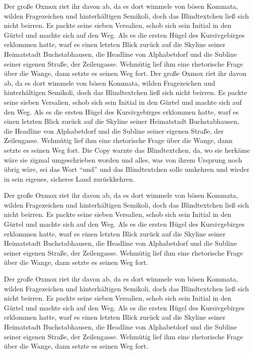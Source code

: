 \documentclass[%
	12pt,%
	a4paper,%
	oneside,%
	listof=totoc,
 	index=totoc,
	bibliography = totoc,
	parskip = half,%
	chapterprefix=false,%
	appendixprefix, %
	headings=small,%
]{scrreprt}
\begin{document}
Der große Oxmox riet ihr davon ab, da es dort wimmele von bösen Kommata, wilden Fragezeichen und hinterhältigen Semikoli, doch das Blindtextchen ließ sich nicht beirren. Es packte seine sieben Versalien, schob sich sein Initial in den Gürtel und machte sich auf den Weg. Als es die ersten Hügel des Kursivgebirges erklommen hatte, warf es einen letzten Blick zurück auf die Skyline seiner Heimatstadt Buchstabhausen, die Headline von Alphabetdorf und die Subline seiner eigenen Straße, der Zeilengasse. Wehmütig lief ihm eine rhetorische Frage über die Wange, dann setzte es seinen Weg fort. Der große Oxmox riet ihr davon ab, da es dort wimmele von bösen Kommata, wilden Fragezeichen und hinterhältigen Semikoli, doch das Blindtextchen ließ sich nicht beirren. Es packte seine sieben Versalien, schob sich sein Initial in den Gürtel und machte sich auf den Weg. Als es die ersten Hügel des Kursivgebirges erklommen hatte, warf es einen letzten Blick zurück auf die Skyline seiner Heimatstadt Buchstabhausen, die Headline von Alphabetdorf und die Subline seiner eigenen Straße, der Zeilengasse. Wehmütig lief ihm eine rhetorische Frage über die Wange, dann setzte es seinen Weg fort. Die Copy warnte das Blindtextchen, da, wo sie herkäme wäre sie zigmal umgeschrieben worden und alles, was von ihrem Ursprung noch übrig wäre, sei das Wort "`und"'  und das Blindtextchen solle umkehren und wieder in sein eigenes, sicheres Land zurückkehren.

Der große Oxmox riet ihr davon ab, da es dort wimmele von bösen Kommata, wilden Fragezeichen und hinterhältigen Semikoli, doch das Blindtextchen ließ sich nicht beirren. Es packte seine sieben Versalien, schob sich sein Initial in den Gürtel und machte sich auf den Weg. Als es die ersten Hügel des Kursivgebirges erklommen hatte, warf es einen letzten Blick zurück auf die Skyline seiner Heimatstadt Buchstabhausen, die Headline von Alphabetdorf und die Subline seiner eigenen Straße, der Zeilengasse. Wehmütig lief ihm eine rhetorische Frage über die Wange, dann setzte es seinen Weg fort.

Der große Oxmox riet ihr davon ab, da es dort wimmele von bösen Kommata, wilden Fragezeichen und hinterhältigen Semikoli, doch das Blindtextchen ließ sich nicht beirren. Es packte seine sieben Versalien, schob sich sein Initial in den Gürtel und machte sich auf den Weg. Als es die ersten Hügel des Kursivgebirges erklommen hatte, warf es einen letzten Blick zurück auf die Skyline seiner Heimatstadt Buchstabhausen, die Headline von Alphabetdorf und die Subline seiner eigenen Straße, der Zeilengasse. Wehmütig lief ihm eine rhetorische Frage über die Wange, dann setzte es seinen Weg fort.
\end{document}
